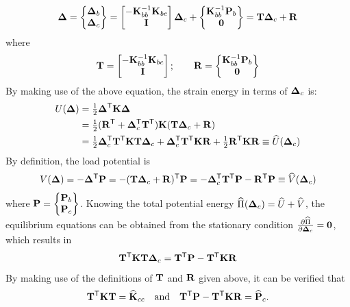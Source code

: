 \begin{equation}
  \bm{\Delta} = \begin{Bmatrix}\bm{\Delta}_b\\ \bm{\Delta}_c\end{Bmatrix} = \begin{bmatrix}-\mathbf{K}_{bb}^{-1}\mathbf{K}_{bc}\\ \mathbf{I}\end{bmatrix}\bm{\Delta}_c + \begin{Bmatrix}\mathbf{K}_{bb}^{-1}\mathbf{P}_b\\ \mathbf{0}\end{Bmatrix} = \mathbf{T}\bm{\Delta}_c + \mathbf{R}
\end{equation}
where
\begin{equation*}
  \mathbf{T} = \begin{bmatrix}-\mathbf{K}_{bb}^{-1}\mathbf{K}_{bc}\\ \mathbf{I}\end{bmatrix};\qquad \mathbf{R} = \begin{Bmatrix}\mathbf{K}_{bb}^{-1}\mathbf{P}_b\\ \mathbf{0}\end{Bmatrix}
\end{equation*}
By making use of the above equation, the strain energy in terms of $\bm{\Delta}_c$ is:
\begin{equation*}
  \begin{aligned}
    U(\bm{\Delta}) &= \tfrac12\bm{\Delta}^{\mathsf{T}}\mathbf{K}\bm{\Delta}\\
    &= \tfrac12(\mathbf{R}^{\mathsf{T}} + \bm{\Delta}_c^{\mathsf{T}}\mathbf{T}^{\mathsf{T}})\mathbf{K}(\mathbf{T}\bm{\Delta}_c + \mathbf{R})\\
    &= \tfrac12\bm{\Delta}_c^{\mathsf{T}}\mathbf{T}^{\mathsf{T}}\mathbf{K}\mathbf{T}\bm{\Delta}_c + \bm{\Delta}_c^{\mathsf{T}}\mathbf{T}^{\mathsf{T}}\mathbf{K}\mathbf{R} + \tfrac12\mathbf{R}^{\mathsf{T}}\mathbf{K}\mathbf{R} \equiv \widehat U(\bm{\Delta}_c)
  \end{aligned}
\end{equation*}
By definition, the load potential is
\begin{equation*}
  V(\bm{\Delta}) = -\bm{\Delta}^{\mathsf{T}}\mathbf{P} = -(\mathbf{T}\bm{\Delta}_c + \mathbf{R})^{\mathsf{T}}\mathbf{P} = -\bm{\Delta}_c^{\mathsf{T}}\mathbf{T}^{\mathsf{T}}\mathbf{P} - \mathbf{R}^{\mathsf{T}}\mathbf{P} \equiv \widehat V(\bm{\Delta}_c)
\end{equation*}
where $\mathbf{P} = \begin{Bmatrix}\mathbf{P}_b\\ \mathbf{P}_c\end{Bmatrix}$. Knowing the total potential energy $\widehat\Pi(\bm{\Delta}_c) = \widehat U + \widehat V$, the equilibrium equations can be obtained from the stationary condition $\frac{\partial \widehat\Pi}{\partial \bm{\Delta}_c} = \mathbf{0}$, which results in
\begin{equation}
  \mathbf{T}^{\mathsf{T}}\mathbf{K}\mathbf{T}\bm{\Delta}_c = \mathbf{T}^{\mathsf{T}}\mathbf{P} - \mathbf{T}^{\mathsf{T}}\mathbf{K}\mathbf{R}
\end{equation}
By making use of the definitions of $\mathbf{T}$ and $\mathbf{R}$ given above, it can be verified that
\begin{equation*}
  \mathbf{T}^{\mathsf{T}}\mathbf{K}\mathbf{T} = \widehat{\mathbf{K}}_{cc}\quad\text{and}\quad \mathbf{T}^{\mathsf{T}}\mathbf{P} - \mathbf{T}^{\mathsf{T}}\mathbf{K}\mathbf{R} = \widehat{\mathbf{P}}_c.
\end{equation*}


